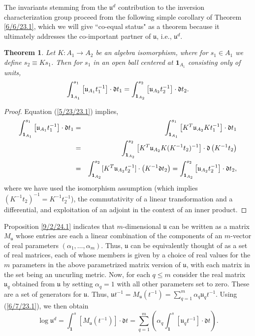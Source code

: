 \documentclass{amsart}
\numberwithin{equation}{section}
\newtheorem{theorem}{Theorem}
\theoremstyle{definition}
\numberwithin{theorem}{section}
\begin{document}
The invariants stemming from the $\mathfrak{u}^d$ contribution to the inversion characterization group proceed from the following simple corollary of Theorem \ref{6/6/23.1}, which we will give ``co-equal status" as a theorem because it ultimately addresses the co-important  partner of $\mathfrak{u}$, i.e., $\mathfrak{u}^d$. 

\begin{theorem}\label{6/6/23.2} Let $K:A_1\rightarrow A_2$ be an algebra isomorphism, where for $s_1\in A_1$ we define $s_2\equiv Ks_1$.  Then for $s_1$ in an open ball centered at $\mathbf{1}_{A_1}$ consisting only of units, \begin{equation}\label{9/6/24.2} \int_{{\bf 1}_{A_1}}^{s_1} \left[\mathfrak{u}_{A_1}t_1^{-1}\right]\cdot \mathfrak{d}t_1 
= \int_{{\bf 1}_{A_2}}^{s_2} \left[\mathfrak{u}_{A_2}t_2^{-1}\right]\cdot \mathfrak{d}t_2 . \end{equation} \end{theorem}

\begin{proof} 
Equation (\ref{5/23/23.1}) implies,
\begin{eqnarray*} \int_{{\bf 1}_{A_1}}^{s_1} \left[\mathfrak{u}_{A_1}t_1^{-1}\right]\cdot \mathfrak{d}t_1 &=& \int_{{\bf 1}_{A_1}}^{s_1} \left[ K^T\mathfrak{u}_{A_2}Kt_1^{-1}\right]\cdot \mathfrak{d}t_1 \\ &=& 
\int_{{\bf 1}_{A_2}}^{s_2} \left[ K^T\mathfrak{u}_{A_2}K (K^{-1}t_2)^{-1}\right]\cdot \mathfrak{d}\left(K^{-1}t_2\right) \\ &=& \int_{{\bf 1}_{A_2}}^{s_2} [K^T\mathfrak{u}_{A_2}t_2^{-1}]\cdot \left(K^{-1}\mathfrak{d}t_2\right) = \int_{{\bf 1}_{A_2}}^{s_2} \left[\mathfrak{u}_{A_2}t_2^{-1}\right]\cdot \mathfrak{d}t_2, 
\end{eqnarray*} 
where we have used the isomorphism assumption (which implies $(K^{-1}t_2)^{-1} = K^{-1}t_2^{-1}$), the commutativity of a linear transformation and a differential, and exploitation of an adjoint in the context of an inner product.
\end{proof}

Proposition \ref{9/2/24.1} indicates that $m$-dimensional $\mathfrak{u}$ can be written as a matrix $M_\mathfrak{u}$ whose entries are each a linear combination of the components of an $m$-vector of real parameters $(\alpha_1, \dots, \alpha_m)$.   Thus, $\mathfrak{u}$ can be equivalently thought of as a set of real matrices, each of whose members is given by a choice of real values for the $m$ parameters in the above parametrized matrix version of $\mathfrak{u}$, with each matrix in the set being an uncurling metric.  Now, for each $q\le m$ consider the real matrix  $\mathfrak{u}_q$ obtained from $\mathfrak{u}$ by setting $\alpha_q =1$ with all other parameters set to zero.  These are a set of generators for $\mathfrak{u}$. Thus, $\mathfrak{u}t^{-1} = M_{\mathfrak{u}}(t^{-1}) = \sum_{q=1}^m \alpha_q \mathfrak{u}_q t^{-1}$.   Using (\ref{6/7/23.1}), we then obtain \begin{equation}\label{9/26/23.1} \log  \mathfrak{u}^d = \int_{\mathbf{1}}^s [M_{\mathfrak{u}} (t^{-1})]\cdot \mathfrak{d}t =\sum_{q=1}^m \left(\alpha_q \int_{\mathbf{1}}^s [\mathfrak{u}_q t^{-1}]\cdot \mathfrak{d}t\right).\end{equation}  
\end{document}
